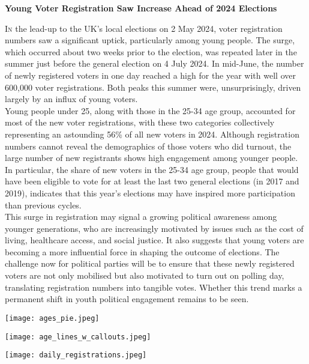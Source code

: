 \documentclass[9pt]{article}
\begin{document}
\noindent
{\headline\fontsize{37}{30}\bfseries Young Voter Registration Saw Increase Ahead of 2024 Elections}

\vspace{3pt}

\noindent
\begin{minipage}{0.45\textwidth}
    \begin{justify}
    \lettrine[lines=3, lraise=0]{I}n the lead-up to the UK’s local elections on 2 May 2024, voter registration numbers saw a significant uptick, particularly among young people. The surge, which occurred about two weeks prior to the election, was repeated later in the summer just before the general election on 4 July 2024. In mid-June, the number of newly registered voters in one day reached a high for the year with well over 600,000 voter registrations. Both peaks this summer were, unsurprisingly, driven largely by an influx of young voters. \\
 Young people under 25, along with those in the 25-34 age group, accounted for most of the new voter registrations, with these two categories collectively representing an astounding 56\% of all new voters in 2024. Although registration numbers cannot reveal the demographics of those voters who did turnout, the large number of new registrants shows high engagement among younger people. In particular, the share of new voters in the 25-34 age group, people that would have been eligible to vote for at least the last two general elections (in 2017 and 2019), indicates that this year’s elections may have inspired more participation than previous cycles.\\
     This surge in registration may signal a growing political awareness among younger generations, who are increasingly motivated by issues such as the cost of living, healthcare access, and social justice. It also suggests that young voters are becoming a more influential force in shaping the outcome of elections. The challenge now for political parties will be to ensure that these newly registered voters are not only mobilised but also motivated to turn out on polling day, translating registration numbers into tangible votes. Whether this trend marks a permanent shift in youth political engagement remains to be seen.

    \end{justify}
\end{minipage}%
\hspace{0.05\textwidth}
\begin{minipage}[t]{0.45\textwidth}
  \texttt{[image: ages\_pie.jpeg]}
  
  \vspace{5pt} 
  
  \texttt{[image: age\_lines\_w\_callouts.jpeg]}
\end{minipage}

\vspace{3pt}

\begin{center}
  \texttt{[image: daily\_registrations.jpeg]}
\end{center}
\end{document}
